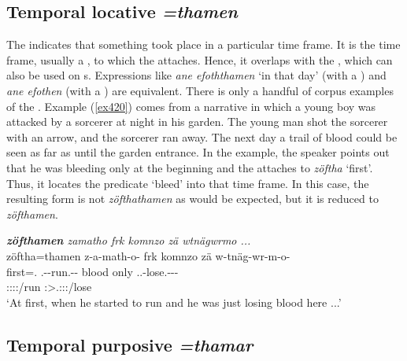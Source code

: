 \subsection{Temporal locative \emph{=thamen}} \label{temporallocativecase}  

The   indicates that something took place in a particular time frame. It is the time frame, usually a  , to which the   attaches. Hence, it overlaps with the  , which can also be used on  s. Expressions like \emph{ane efoththamen} `in that day' (with a  ) and \emph{ane efothen} (with a ) are equivalent. There is only a handful of corpus examples of the  . Example (\ref{ex420}) comes from a narrative in which a young boy was attacked by a sorcerer at night in his garden. The young man shot the sorcerer with an arrow, and the sorcerer ran away. The next day a trail of blood could be seen as far as until the garden entrance. In the example, the speaker points out that he was bleeding only at the beginning and the   attaches to \emph{zöftha} `first'. Thus, it locates the predicate `bleed' into that time frame. In this case, the resulting form is not \emph{zöfthathamen} as would be expected, but it is reduced to \emph{zöfthamen}.

\begin{exe}
	\ex \emph{\textbf{zöfthamen} zamatho frk komnzo zä wtnägwrmo ...}\\
	\glll zöftha=thamen z-a-math-o-\Zero{} frk komnzo zä w-tnäg-wr-m-o-\Zero\\
	first=\Temp.\Loc{} \M.\Gam-\Ndu-run.\Rs-\Andat-\Stsg{} blood only \Prox{} \Tsg.\F.\Alph-lose.\Ext-\Ndu-\Dur-\Andat{}\\
	{} {} \footnotesize{\Stsg:\Sbj:\Rpst:\Pfv:\Andat/run} {} {} {} \footnotesize{\Stsg:\Sbj>\Tsg.\F:\Rpst:\Dur:\Andat/lose}\\
	\trans `At first, when he started to run and he was just losing blood here ...'\\
	\label{ex420}
\end{exe}

\subsection{Temporal purposive \emph{=thamar}} \label{temporalpurposivecase}

